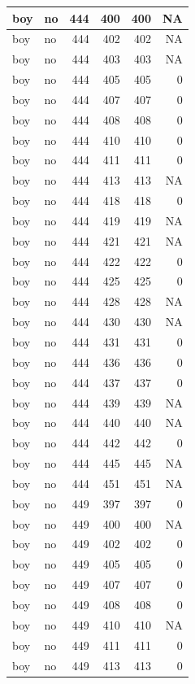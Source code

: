 \documentclass[man]{apa6}
\begin{document}
\begin{tabular}{l|l|r|r|r|r}
\hline
boy & no & 444 & 400 & 400 & NA\\
\hline
boy & no & 444 & 402 & 402 & NA\\
\hline
boy & no & 444 & 403 & 403 & NA\\
\hline
boy & no & 444 & 405 & 405 & 0\\
\hline
boy & no & 444 & 407 & 407 & 0\\
\hline
boy & no & 444 & 408 & 408 & 0\\
\hline
boy & no & 444 & 410 & 410 & 0\\
\hline
boy & no & 444 & 411 & 411 & 0\\
\hline
boy & no & 444 & 413 & 413 & NA\\
\hline
boy & no & 444 & 418 & 418 & 0\\
\hline
boy & no & 444 & 419 & 419 & NA\\
\hline
boy & no & 444 & 421 & 421 & NA\\
\hline
boy & no & 444 & 422 & 422 & 0\\
\hline
boy & no & 444 & 425 & 425 & 0\\
\hline
boy & no & 444 & 428 & 428 & NA\\
\hline
boy & no & 444 & 430 & 430 & NA\\
\hline
boy & no & 444 & 431 & 431 & 0\\
\hline
boy & no & 444 & 436 & 436 & 0\\
\hline
boy & no & 444 & 437 & 437 & 0\\
\hline
boy & no & 444 & 439 & 439 & NA\\
\hline
boy & no & 444 & 440 & 440 & NA\\
\hline
boy & no & 444 & 442 & 442 & 0\\
\hline
boy & no & 444 & 445 & 445 & NA\\
\hline
boy & no & 444 & 451 & 451 & NA\\
\hline
boy & no & 449 & 397 & 397 & 0\\
\hline
boy & no & 449 & 400 & 400 & NA\\
\hline
boy & no & 449 & 402 & 402 & 0\\
\hline
boy & no & 449 & 405 & 405 & 0\\
\hline
boy & no & 449 & 407 & 407 & 0\\
\hline
boy & no & 449 & 408 & 408 & 0\\
\hline
boy & no & 449 & 410 & 410 & NA\\
\hline
boy & no & 449 & 411 & 411 & 0\\
\hline
boy & no & 449 & 413 & 413 & 0\\

\end{tabular}
\end{document}
